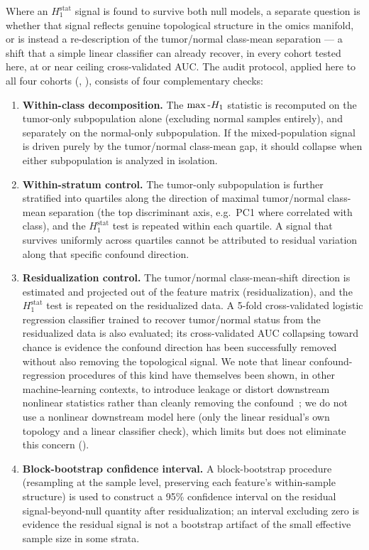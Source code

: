 Where an $H_1^{\text{stat}}$ signal is found to survive both null models, a separate question is whether that signal reflects genuine topological structure in the omics manifold, or is instead a re-description of the tumor/normal class-mean separation --- a shift that a simple linear classifier can already recover, in every cohort tested here, at or near ceiling cross-validated AUC. The audit protocol, applied here to all four cohorts (, ), consists of four complementary checks:

\begin{enumerate}
\item \textbf{Within-class decomposition.} The $\max\text{-}H_1$ statistic is recomputed on the tumor-only subpopulation alone (excluding normal samples entirely), and separately on the normal-only subpopulation. If the mixed-population signal is driven purely by the tumor/normal class-mean gap, it should collapse when either subpopulation is analyzed in isolation.
\item \textbf{Within-stratum control.} The tumor-only subpopulation is further stratified into quartiles along the direction of maximal tumor/normal class-mean separation (the top discriminant axis, e.g.\ PC1 where correlated with class), and the $H_1^{\text{stat}}$ test is repeated within each quartile. A signal that survives uniformly across quartiles cannot be attributed to residual variation along that specific confound direction.
\item \textbf{Residualization control.} The tumor/normal class-mean-shift direction is estimated and projected out of the feature matrix (residualization), and the $H_1^{\text{stat}}$ test is repeated on the residualized data. A 5-fold cross-validated logistic regression classifier trained to recover tumor/normal status from the residualized data is also evaluated; its cross-validated AUC collapsing toward chance is evidence the confound direction has been successfully removed without also removing the topological signal. We note that linear confound-regression procedures of this kind have themselves been shown, in other machine-learning contexts, to introduce leakage or distort downstream nonlinear statistics rather than cleanly removing the confound~\cite{hamdan2023}; we do not use a nonlinear downstream model here (only the linear residual's own topology and a linear classifier check), which limits but does not eliminate this concern ().
\item \textbf{Block-bootstrap confidence interval.} A block-bootstrap procedure (resampling at the sample level, preserving each feature's within-sample structure) is used to construct a 95\% confidence interval on the residual signal-beyond-null quantity after residualization; an interval excluding zero is evidence the residual signal is not a bootstrap artifact of the small effective sample size in some strata.
\end{enumerate}

